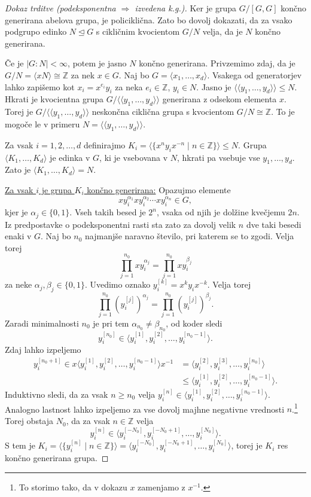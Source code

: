 \documentclass[11pt]{book}
\renewcommand{\llangle}{\langle\langle}
\renewcommand{\rrangle}{\rangle\rangle}
\def\ZZ{\mathbb{Z}}
\theoremstyle{definition}
\theoremstyle{zgled}
\theoremstyle{odprtproblem}
\theoremstyle{domacanaloga}
\newenvironment{dokaz}
    {\color{siva}\begin{proof}}
    {\end{proof}}
\theoremstyle{izrek}
\begin{document}
\begin{dokaz}[Dokaz trditve {\sc (podeksponentna $\Rightarrow$ izvedena k.g.)}]
Ker je grupa $G/[G,G]$ končno generirana abelova grupa, je policiklična. Zato bo dovolj dokazati, da za vsako podgrupo edinko $N \unlhd G$ s cikličnim kvocientom $G/N$ velja, da je $N$ končno generirana.

Če je $|G:N| < \infty$, potem je jasno $N$ končno generirana. Privzemimo zdaj, da je $G/N = \langle x N \rangle \cong \ZZ$ za nek $x \in G$. Naj bo $G = \langle x_1, \dots, x_d \rangle$. Vsakega od generatorjev lahko zapišemo kot $x_i = x^{e_i} y_i$ za neka $e_i \in \ZZ$, $y_i \in N$. Jasno je $\llangle y_1, \dots, y_d \rrangle \leq N$. Hkrati je kvocientna grupa $G/\llangle y_1, \dots, y_d \rrangle$ generirana z odsekom elementa $x$. Torej je $G/\llangle y_1, \dots, y_d \rrangle$ neskončna ciklična grupa s kvocientom $G/N \cong \ZZ$. To je mogoče le v primeru $N = \llangle y_1, \dots, y_d \rrangle$.

Za vsak $i = 1, 2, \dots, d$ definirajmo $K_i = \langle \{ x^{n} y_i x^{-n} \mid n \in \ZZ \} \rangle \leq N$. Grupa $\langle K_1, \dots, K_d \rangle$ je edinka v $G$, ki je vsebovana v $N$, hkrati pa vsebuje vse $y_1, \dots, y_d$. Zato je $\langle K_1, \dots, K_d \rangle = N$. 

\underline{Za vsak $i$ je grupa $K_i$ končno generirana:}
Opazujmo elemente
\[
x y_i^{\alpha_1} x y_i^{\alpha_2} \cdots x y_i^{\alpha_n} \in G,
\]
kjer je $\alpha_j \in \{ 0, 1 \}$. Vseh takih besed je $2^n$, vsaka od njih je dolžine kvečjemu $2n$. Iz predpostavke o podeksponentni rasti sta zato za dovolj velik $n$ dve taki besedi enaki v $G$. Naj bo $n_0$ najmanjše naravno število, pri katerem se to zgodi. Velja torej
\[
\prod_{j = 1}^{n_0} x y_i^{\alpha_j} = \prod_{j = 1}^{n_0} x y_i^{\beta_j} 
\]
za neke $\alpha_j, \beta_j \in \{ 0, 1 \}$.
Uvedimo oznako $y_i^{[k]} = x^k y_i x^{-k}$. Velja torej
\[
\prod_{j = 1}^{n_0} \left( y_i^{[j]} \right)^{\alpha_j} =
\prod_{j = 1}^{n_0} \left( y_i^{[j]} \right)^{\beta_j}.
\]
Zaradi minimalnosti $n_0$ je pri tem $\alpha_{n_0} \neq \beta_{n_0}$, od koder sledi
\[
y_i^{[n_0]} \in \langle y_i^{[1]}, y_i^{[2]}, \dots, y_i^{[n_0 - 1]} \rangle.
\]
Zdaj lahko izpeljemo
\begin{align*}
y_i^{[n_0 + 1]} \in x \langle y_i^{[1]}, y_i^{[2]}, \dots, y_i^{[n_0 - 1]} \rangle x^{-1} &= \langle  y_i^{[2]}, y_i^{[3]}, \dots, y_i^{[n_0]} \rangle \\
&\leq \langle y_i^{[1]}, y_i^{[2]}, \dots, y_i^{[n_0 - 1]} \rangle.
\end{align*}
Induktivno sledi, da za vsak $n \geq n_0$ velja $y_i^{[n]} \in \langle y_i^{[1]}, y_i^{[2]}, \dots, y_i^{[n_0 - 1]} \rangle$. Analogno lastnost lahko izpeljemo za vse dovolj majhne negativne vrednosti $n$.\footnote{To storimo tako, da v dokazu $x$ zamenjamo z $x^{-1}$.} Torej obstaja $N_0$, da za vsak $n \in \ZZ$ velja
\[
y_i^{[n]} \in \langle y_i^{[- N_0]}, y_i^{[-N_0 + 1]}, \dots, y_i^{[N_0]} \rangle.
\]
S tem je $K_i = \langle \{ y_i^{[n]} \mid n \in \ZZ \} \rangle = \langle y_i^{[- N_0]}, y_i^{[-N_0 + 1]}, \dots, y_i^{[N_0]} \rangle$, torej je $K_i$ res končno generirana grupa.
\end{dokaz}
\end{document}
